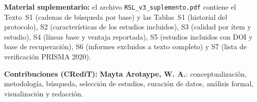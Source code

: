 \documentclass[12pt, a4paper]{article}
\begin{document}
\textbf{Material suplementario:} el archivo \texttt{RSL\_v3\_suplemento.pdf} contiene el Texto~S1 (cadenas de búsqueda por base) y las Tablas~S1 (historial del protocolo), S2 (características de los estudios incluidos), S3 (calidad por ítem y estudio), S4 (líneas base y ventaja reportada), S5 (estudios incluidos con DOI y base de recuperación), S6 (informes excluidos a texto completo) y S7 (lista de verificación PRISMA 2020).

\textbf{Contribuciones (CRediT):} \textbf{Mayta Arotaype, W. A.}: conceptualización, metodología, búsqueda, selección de estudios, curación de datos, análisis formal, visualización y redacción.



\end{document}
